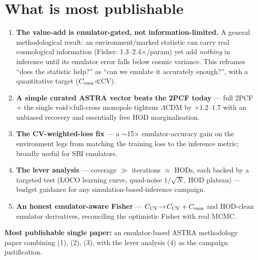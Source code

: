 \documentclass[11pt]{article}
\newcommand{\Cemu}{C_{\rm emu}}
\newcommand{\Ccv}{C_{\rm CV}}
\begin{document}
\section{What is most publishable}
\begin{enumerate}
\item \textbf{The value-add is emulator-gated, not information-limited.} A general
  methodological result: an environment/marked statistic can carry real cosmological
  information (Fisher: 1.3--2.4$\times$/param) yet add \emph{nothing} in inference until
  its emulator error falls below cosmic variance. This reframes ``does the statistic
  help?'' as ``can we emulate it accurately enough?'', with a quantitative target
  ($\Cemu\!\ll\!$CV).
\item \textbf{A simple curated ASTRA vector beats the 2PCF today} --- full 2PCF $+$ the
  single void$\times$full-cross monopole tightens $\Lambda$CDM by $\times1.2$--$1.7$ with
  an unbiased recovery and essentially free HOD marginalisation.
\item \textbf{The CV-weighted-loss fix} --- a $\sim$15$\times$ emulator-accuracy gain on
  the environment legs from matching the training loss to the inference metric; broadly
  useful for SBI emulators.
\item \textbf{The lever analysis} --- coverage $\gg$ iterations $\approx$ HODs, each
  backed by a targeted test (LOCO learning curve, quad-noise $1/\sqrt{N}$, HOD plateau)
  --- budget guidance for any simulation-based-inference campaign.
\item \textbf{An honest emulator-aware Fisher} --- $\Ccv\!\to\!\Ccv+\Cemu$ and HOD-clean
  emulator derivatives, reconciling the optimistic Fisher with real MCMC.
\end{enumerate}
\noindent\textbf{Most publishable single paper:} an emulator-based ASTRA methodology
paper combining (1), (2), (3), with the lever analysis (4) as the campaign justification.
\end{document}
